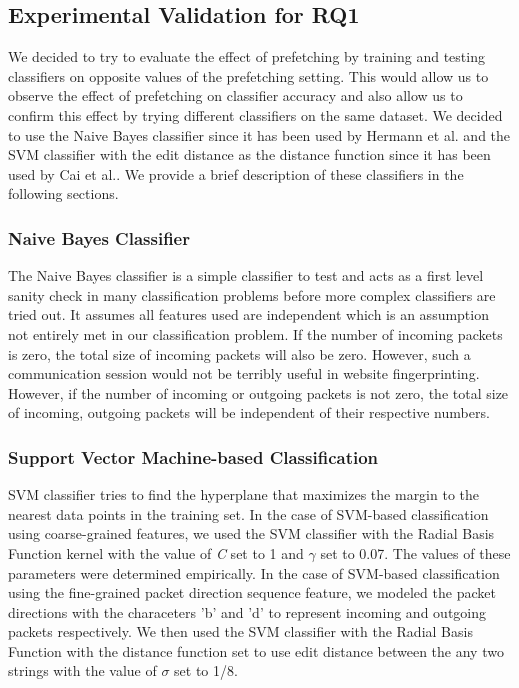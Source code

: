 \subsection{Experimental Validation for RQ1}
We decided to try to evaluate the effect of prefetching by training and testing classifiers on opposite values of the prefetching setting. 
This would allow us to observe the effect of prefetching on classifier accuracy and also allow us to confirm this effect by trying different classifiers on the same dataset.
We decided to use the Naive Bayes classifier since it has been used by Hermann et al.\cite{hermann} and the SVM classifier with the edit distance as the distance function since it has been used by Cai et al.\cite{cai2012touching}. We provide a brief description of these classifiers in the following sections.

\subsubsection{Naive Bayes Classifier} 
The Naive Bayes classifier is a simple classifier to test and acts as a first level sanity check in many classification problems before more complex classifiers are tried out. 
It assumes all features used are independent which is an assumption not entirely met in our classification problem. 
If the number of incoming packets is zero, the total size of incoming packets will also be zero.
However, such a communication session would not be terribly useful in website fingerprinting.
However, if the number of incoming or outgoing packets is not zero, the total size of incoming, outgoing packets will be independent of their respective numbers.

\subsubsection{Support Vector Machine-based Classification}
SVM classifier tries to find the hyperplane that maximizes the margin to the nearest data points in the training set. 
In the case of SVM-based classification using coarse-grained features, we used the SVM classifier with the Radial Basis Function kernel with the value of \textit{C} set to 1 and $\gamma$ set to 0.07. The values of these parameters were determined empirically. 
In the case of SVM-based classification using the fine-grained packet direction sequence feature, we modeled the packet directions with the characeters 'b' and 'd' to represent incoming and outgoing packets respectively. 
We then used the SVM classifier with the Radial Basis Function with the distance function set to use edit distance between the any two strings with the value of $\sigma$ set to 1/8. 

